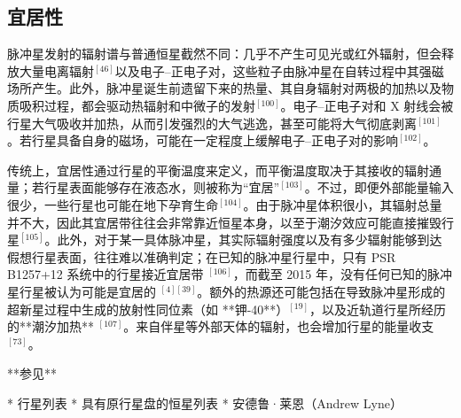 \subsection{宜居性}
脉冲星发射的辐射谱与普通恒星截然不同：几乎不产生可见光或红外辐射，但会释放大量电离辐射$^{[46]}$以及电子–正电子对，这些粒子由脉冲星在自转过程中其强磁场所产生。此外，脉冲星诞生前遗留下来的热量、其自身辐射对两极的加热以及物质吸积过程，都会驱动热辐射和中微子的发射$^{[100]}$。电子–正电子对和 X 射线会被行星大气吸收并加热，从而引发强烈的大气逃逸，甚至可能将大气彻底剥离$^{[101]}$。若行星具备自身的磁场，可能在一定程度上缓解电子–正电子对的影响$^{[102]}$。

传统上，宜居性通过行星的平衡温度来定义，而平衡温度取决于其接收的辐射通量；若行星表面能够存在液态水，则被称为“宜居”$^{[103]}$。不过，即便外部能量输入很少，一些行星也可能在地下孕育生命$^{[104]}$。由于脉冲星体积很小，其辐射总量并不大，因此其宜居带往往会非常靠近恒星本身，以至于潮汐效应可能直接摧毁行星$^{[105]}$。此外，对于某一具体脉冲星，其实际辐射强度以及有多少辐射能够到达假想行星表面，往往难以准确判定；在已知的脉冲星行星中，只有 PSR B1257+12 系统中的行星接近宜居带 $^{[106]}$，而截至 2015 年，没有任何已知的脉冲星行星被认为可能是宜居的 $^{[4][39]}$。额外的热源还可能包括在导致脉冲星形成的超新星过程中生成的放射性同位素（如 **钾-40**）$^{[19]}$，以及近轨道行星所经历的**潮汐加热** $^{[107]}$。来自伴星等外部天体的辐射，也会增加行星的能量收支 $^{[73]}$。

**参见**

* 行星列表
* 具有原行星盘的恒星列表
* 安德鲁·莱恩（Andrew Lyne）
